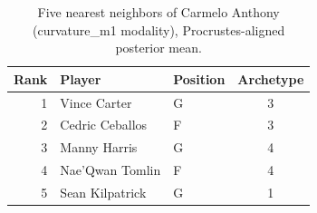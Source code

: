 \begin{table}[htbp]
  \centering\small
  \begin{tabular}{rllc}
    \toprule
    Rank & Player & Position & Archetype \\
    \midrule
    1 & Vince Carter & G & 3 \\
    2 & Cedric Ceballos & F & 3 \\
    3 & Manny Harris & G & 4 \\
    4 & Nae'Qwan Tomlin & F & 4 \\
    5 & Sean Kilpatrick & G & 1 \\
    \bottomrule
  \end{tabular}
  \caption{Five nearest neighbors of Carmelo Anthony (curvature_m1 modality), Procrustes-aligned posterior mean.}
  \label{tab:Carmelo_Anthony_neighbors_curvature_m1}
\end{table}

